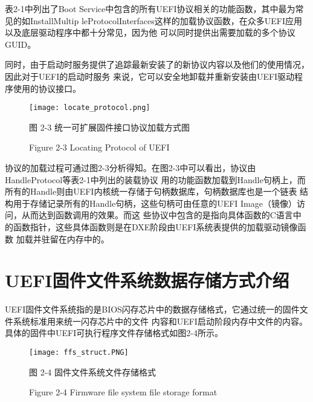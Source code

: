 表2-1中列出了Boot Service中包含的所有UEFI协议相关的功能函数，其中最为常见的如InstallMultip
leProtocolInterfaces这样的加载协议函数，在众多UEFI应用以及底层驱动程序中都十分常见，因为他
可以同时提供出需要加载的多个协议GUID。
\par 同时，由于启动时服务提供了追踪最新安装了的新协议内容以及他们的使用情况，因此对于UEFI的启动时服务
来说，它可以安全地卸载并重新安装由UEFI驱动程序使用的协议接口。

\begin{figure}[htb]
    \vspace{0cm}   
    \setlength{\abovecaptionskip}{0.3cm}  
	\centering
    \texttt{[image: locate\_protocol.png]}
    \caption*{图 2-3 统一可扩展固件接口协议加载方式图}
    \setlength{\belowcaptionskip}{-0.7cm}
    \caption*{Figure 2-3 Locating Protocol of UEFI}
\end{figure}

\par 协议的加载过程可通过图2-3分析得知。在图2-3中可以看出，协议由HandleProtocol等表2-1中列出的装载协议
用的功能函数加载到Handle句柄上，而所有的Handle则由UEFI内核统一存储于句柄数据库，句柄数据库也是一个链表
结构用于存储记录所有的Handle句柄，这些句柄可由任意的UEFI Image（镜像）访问，从而达到函数调用的效果。而这
些协议中包含的是指向具体函数的C语言中的函数指针，这些具体函数则是在DXE阶段由UEFI系统表提供的加载驱动镜像函数
加载并驻留在内存中的。

%
%
\section{UEFI固件文件系统数据存储方式介绍}
UEFI固件文件系统指的是BIOS闪存芯片中的数据存储格式，它通过统一的固件文件系统标准用来统一闪存芯片中的文件
内容和UEFI启动阶段内存中文件的内容\cite{chinese21}。具体的固件中UEFI可执行程序文件存储格式如图2-4所示。

\begin{figure}[htb]
    \vspace{0cm}   
    \setlength{\abovecaptionskip}{0.3cm}  
	\centering
    \texttt{[image: ffs\_struct.PNG]}
    \caption*{图 2-4 固件文件系统文件存储格式}
    \setlength{\belowcaptionskip}{-0.7cm}
    \caption*{Figure 2-4 Firmware file system file storage format}
\end{figure}

